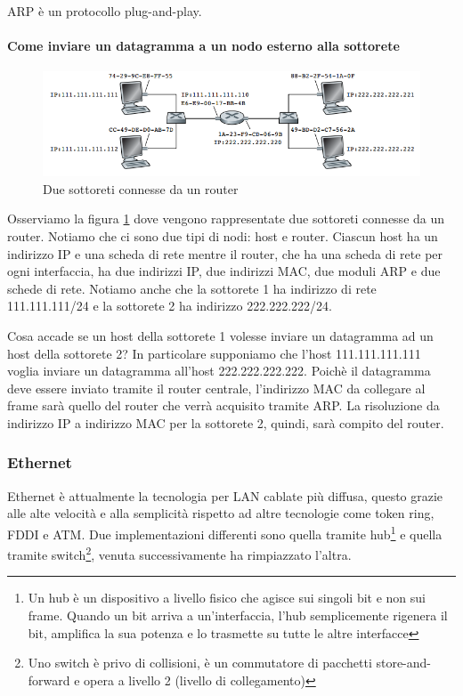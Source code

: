 \documentclass[11pt,a4paper]{article}
\begin{document}
{ARP è un protocollo plug-and-play.

\paragraph{Come inviare un datagramma a un nodo esterno alla sottorete}
\begin{figure}
	\includegraphics[scale=0.6]{img/085.png}
	\caption{Due sottoreti connesse da un router}
	\label{fig: 085}
\end{figure}
Osserviamo la figura \ref{fig: 085} dove vengono rappresentate due sottoreti connesse da un router. Notiamo che ci sono due tipi di nodi: host e router. Ciascun host ha un indirizzo IP e una scheda di rete mentre il router, che ha una scheda di rete per ogni interfaccia, ha due indirizzi IP, due indirizzi MAC, due moduli ARP e due schede di rete. Notiamo anche che la sottorete 1 ha indirizzo di rete 111.111.111/24 e la sottorete 2 ha indirizzo 222.222.222/24.

Cosa accade se un host della sottorete 1 volesse inviare un datagramma ad un host della sottorete 2? In particolare supponiamo che l'host 111.111.111.111 voglia inviare un datagramma all'host 222.222.222.222. Poichè il datagramma deve essere inviato tramite il router centrale, l'indirizzo MAC da collegare al frame sarà quello del router che verrà acquisito tramite ARP. La risoluzione da indirizzo IP a indirizzo MAC per la sottorete 2, quindi, sarà compito del router.

\subsubsection{Ethernet}
Ethernet è attualmente la tecnologia per LAN cablate più diffusa, questo grazie alle alte velocità e alla semplicità rispetto ad altre tecnologie come token ring, FDDI e ATM. Due implementazioni differenti sono quella tramite hub\footnote{Un hub è un dispositivo a livello fisico che agisce sui singoli bit e non sui frame. Quando un bit arriva a un'interfaccia, l'hub semplicemente rigenera il bit, amplifica la sua potenza e lo trasmette su tutte le altre interfacce} e quella tramite switch\footnote{Uno switch è privo di collisioni, è un commutatore di pacchetti store-and-forward e opera a livello 2 (livello di collegamento)}, venuta successivamente ha rimpiazzato l'altra.

}
\end{document}
